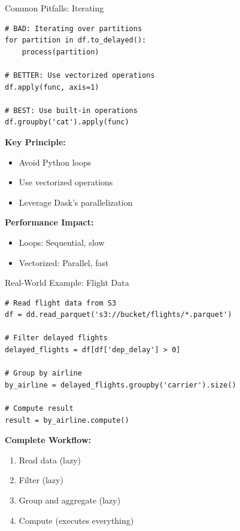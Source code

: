 \documentclass[aspectratio=169]{beamer}
\begin{document}
\begin{frame}[fragile]{Common Pitfalls: Iterating}
\small
\begin{lstlisting}
# BAD: Iterating over partitions
for partition in df.to_delayed():
    process(partition)

# BETTER: Use vectorized operations
df.apply(func, axis=1)

# BEST: Use built-in operations
df.groupby('cat').apply(func)
\end{lstlisting}

\textbf{Key Principle:}
\begin{itemize}
    \item Avoid Python loops
    \item Use vectorized operations
    \item Leverage Dask's parallelization
\end{itemize}

\vspace{0.15cm}
\textbf{Performance Impact:}
\begin{itemize}
    \item Loops: Sequential, slow
    \item Vectorized: Parallel, fast
\end{itemize}
\end{frame}

\begin{frame}[fragile]{Real-World Example: Flight Data}
\small
\begin{lstlisting}
# Read flight data from S3
df = dd.read_parquet('s3://bucket/flights/*.parquet')

# Filter delayed flights
delayed_flights = df[df['dep_delay'] > 0]

# Group by airline
by_airline = delayed_flights.groupby('carrier').size()

# Compute result
result = by_airline.compute()
\end{lstlisting}

\textbf{Complete Workflow:}
\begin{enumerate}
    \item Read data (lazy)
    \item Filter (lazy)
    \item Group and aggregate (lazy)
    \item Compute (executes everything)
\end{enumerate}
\end{frame}
\end{document}
